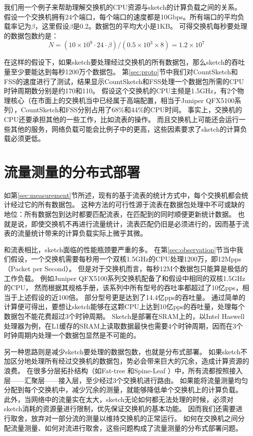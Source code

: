 我们用一个例子来帮助理解交换机的CPU资源与sketch的计算负载之间的关系。
假设一个交换机拥有24个端口，每个端口的速度都是10Gbps。所有端口的平均负载率记为$\beta$，这里假设$\beta$是0.2。数据包的平均大小是1KB。
可得交换机每秒要处理的数据包数约是：
\begin{equation}%
    N = (10\times 10^9\cdot 24 \cdot \beta)/(0.5\times 10^3 \times 8) = 1.2\times 10^7
\end{equation}

在这样的假设下，如果sketch要处理经过交换机的所有数据包，那么sketch的吞吐量至少要能达到每秒1200万个数据包。
第\ref{sec:proto}节中我们对CountSketch和FSS的速度进行了测试，结果显示CountSketch和FSS处理一个数据包所需的CPU时钟周期数分别是约170和110。
假设这个交换机的CPU主频是1.5GHz，有2个物理核心（在市面上的交换机当中已经属于高端配置，相当于Juniper QFX5100系列\cite{juniper2018qfx5100}），CountSketch和FSS分别占用了68\%和44\%的CPU时间。
事实上，交换机的CPU还要承担其他的一些工作，比如流表的操作。
而且交换机上可能还会运行一些其他的服务，网络负载可能会比例子中的更高，这些因素要求了sketch的计算负载必须更低。



\section{流量测量的分布式部署}

如第\ref{sec:measurement}节所述，现有的基于流表的统计方式中，每个交换机都会统计经过它的所有数据包。
这种方法的可行性源于流表在数据包处理中不可或缺的地位：所有数据包到达时都要匹配流表，在匹配到的同时顺便更新统计数据。
也就是说，即使交换机不再进行流量统计，流表匹配仍旧是必须进行的，因而基于流表的流量统计带来的计算负载实际上微乎其微。

和流表相比，sketch面临的性能瓶颈要严重的多。
在第\ref{sec:observation}节当中我们假设，一个交换机需要每秒用一个双核1.5GHz的CPU处理1200万，即12Mpps（Packet per Second）。
但是对于交换机而言，每秒12M个数据包只能算是极低的工作负载。
例如Juniper QFX5100系列交换机配备了和假设中相同的双核1.5GHz的CPU，
然而根据其规格手册，该系列中所有型号的吞吐率都超过了10亿pps\cite{juniper2018qfx5100}，相当于上述假设的近100倍。
部分型号更是达到了14.4亿pps的吞吐量。
通过简单的计算便可得出，要想让sketch能够在这颗CPU上达到10亿pps的吞吐量，处理每个数据包不能花费超过3个时钟周期。
Sketch是部署在SRAM上的，以Intel Haswell处理器为例，在L1缓存的SRAM上读取数据最快也需要4个时钟周期\cite{hammarlund20134th}，因而在3个时钟周期内处理一个数据包显然是不可能的。

另一种思路则是减少sketch要处理的数据包数，也就是分布式部署。
如果sketch不加区分地处理所有经过交换机的数据包，势必会带来巨大的冗余，造成计算资源的浪费。
在很多分层拓扑结构（如Fat-tree \cite{al2008scalable}和Spine-Leaf \cite{alizadeh2013data}）中，所有流都按照接入层——汇聚层——接入层，至少经过3个交换机进行路由。
如果能将流量测量均匀分配到每个交换机中，减少冗余的测量，就能够降低单个交换机上的计算负载。
此外，当网络中的流量实在太大，sketch无论如何都无法处理的时候，必须对sketch消耗的资源量进行限制，优先保证交换机的基本功能。
因而我们还需要进行取舍，放弃对一部分流的测量以维持交换机的正常运行。
如何在交换机之间分配流量测量、如何对流进行取舍，这些问题构成了流量测量的分布式部署问题。

